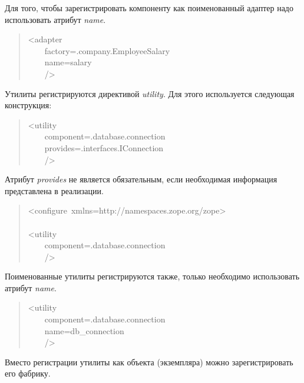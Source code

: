 \documentclass[14pt,a4paper,openany,twoside,final]{extbook}
\providecommand*{\DUroletitlereference}[1]{\textsl{#1}}
\begin{document}
Для того, чтобы зарегистрировать компоненту как поименованный адаптер
надо использовать атрибут \DUroletitlereference{name}.

\begin{quote}{\ttfamily \raggedright \noindent
<adapter\\
~~~~factory=\textquotedbl{}.company.EmployeeSalary\textquotedbl{}\\
~~~~name=\textquotedbl{}salary\textquotedbl{}\\
~~~~/>
}
\end{quote}

Утилиты регистрируются директивой \DUroletitlereference{utility}.  Для этого используется
следующая конструкция:

\begin{quote}{\ttfamily \raggedright \noindent
<utility\\
~~~~component=\textquotedbl{}.database.connection\textquotedbl{}\\
~~~~provides=\textquotedbl{}.interfaces.IConnection\textquotedbl{}\\
~~~~/>
}
\end{quote}

Атрибут \DUroletitlereference{provides} не является обязательным, если необходимая
информация представлена в реализации.

\begin{quote}{\ttfamily \raggedright \noindent
<configure~xmlns=\textquotedbl{}http://namespaces.zope.org/zope\textquotedbl{}>\\
~\\
<utility\\
~~~~component=\textquotedbl{}.database.connection\textquotedbl{}\\
~~~~/>
}
\end{quote}

Поименованные утилиты регистрируются также, только необходимо
использовать атрибут \DUroletitlereference{name}.

\begin{quote}{\ttfamily \raggedright \noindent
<utility\\
~~~~component=\textquotedbl{}.database.connection\textquotedbl{}\\
~~~~name=\textquotedbl{}db\_connection\textquotedbl{}\\
~~~~/>
}
\end{quote}

Вместо регистрации утилиты как объекта (экземпляра) можно
зарегистрировать его фабрику.
\end{document}
